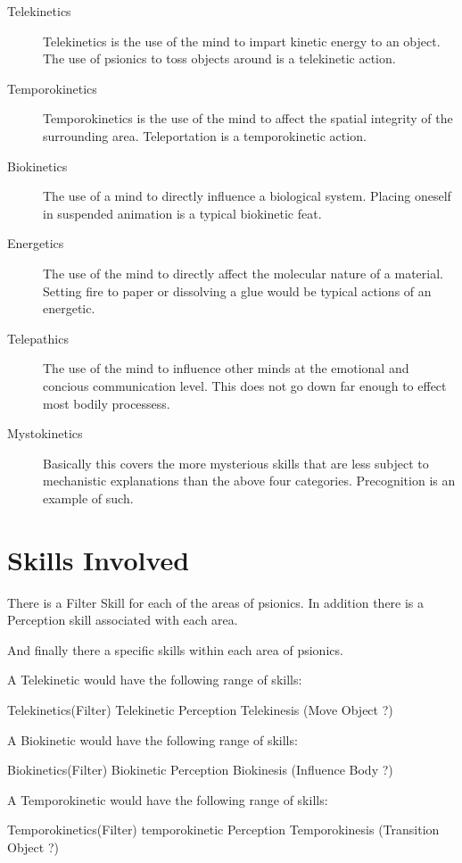 \begin{description}
	\item[Telekinetics]
	Telekinetics is the use of the mind to impart kinetic energy to an
	object. The use of psionics to toss objects around is a telekinetic 
	action.
	\item[Temporokinetics]
	Temporokinetics is the use of the mind to affect the spatial integrity
	of the surrounding area. Teleportation is a temporokinetic action.
	\item[Biokinetics]
	The use of a mind to directly influence a biological system. Placing 
	oneself in suspended animation is a typical biokinetic feat.
	\item[Energetics]
	The use of the mind to directly affect the molecular nature of a
	material. Setting fire to paper or dissolving a glue would be 
	typical actions of an energetic.
    \item[Telepathics]
    The use of the mind to influence other minds at the emotional and concious
    communication level. This does not go down far enough to effect most bodily
    processess.
	\item[Mystokinetics]
    Basically this covers the more mysterious skills that are less subject
    to mechanistic explanations than the above four categories. 
	Precognition is an example of such.
\end{description}

\section{Skills Involved}

There is a Filter Skill for each of the areas of psionics. 
In addition there is a Perception skill associated with each area.

And finally there a specific skills within each area of psionics.

A Telekinetic would have the following range of skills:

Telekinetics(Filter)
Telekinetic Perception
Telekinesis (Move Object ?)

A Biokinetic would have the following range of skills:

Biokinetics(Filter)
Biokinetic Perception
Biokinesis (Influence Body ?)

A Temporokinetic would have the following range of skills:

Temporokinetics(Filter)
temporokinetic Perception
Temporokinesis (Transition Object ?)

